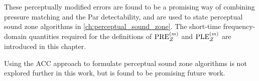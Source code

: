 These perceptually modified errors are found to be a promising way of combining pressure matching and the Par detectability,
and are used to state perceptual sound zone algorithms in \autoref{ch:perceptual_sound_zone}.
The short-time frequency-domain quantities required for the definitions of $\text{PRE}^{(m)}_{\mathcal{Z}}$ and $\text{PLE}^{(m)}_{\mathcal{Z}}$ are introduced in this chapter.

Using the ACC approach to formulate perceptual sound zone algorithms is not explored further in this work, but is found to be promising future work.
